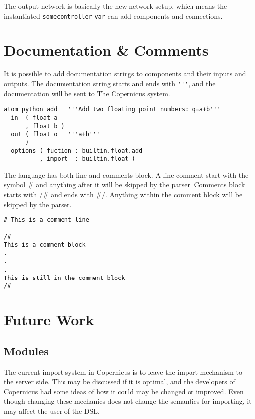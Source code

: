 The output network is basically the new network setup, which means the
instantiated \verb#somecontroller# \verb#var# can add components and
connections.


\section{Documentation \& Comments}
It is possible to add documentation strings to components and their
inputs and outputs. The documentation string starts and ends with
\verb#'''#, and the documentation will be sent to The Copernicus
system.

\begin{verbatim}
atom python add   '''Add two floating point numbers: q=a+b'''
  in  ( float a
      , float b )
  out ( float o   '''a+b'''
      )
  options ( fuction : builtin.float.add
          , import  : builtin.float )
\end{verbatim}

The language has both line and comments block. A line comment start
with the symbol \# and anything after it will be skipped by the
parser. Comments block starts with /\# and ends with \#/. Anything
within the comment block will be skipped by the parser.

\begin{verbatim}
# This is a comment line

/#
This is a comment block
.
.
.
This is still in the comment block
/#
\end{verbatim}


\section{Future Work}

\subsection{Modules}

The current import system in Copernicus is to leave the import
mechanism to the server side. This may be discussed if it is optimal,
and the developers of Copernicus had some ideas of how it could may be
changed or improved. Even though changing these mechanics does not
change the semantics for importing, it may affect the user of the DSL.

